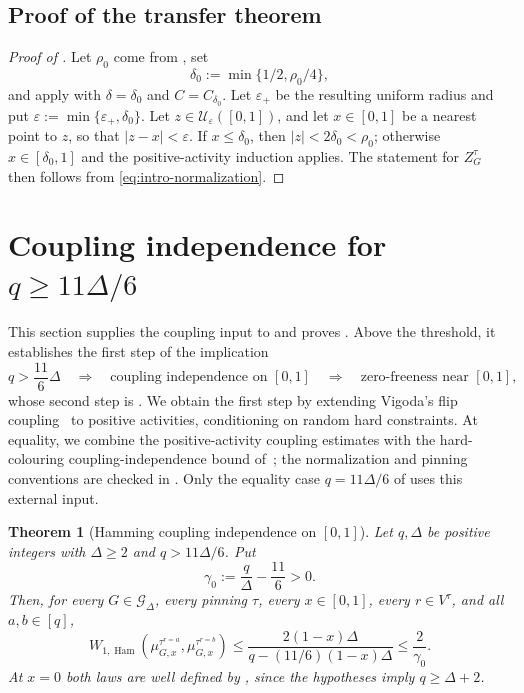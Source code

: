 \documentclass[11pt,reqno]{article}
\theoremstyle{plain}
\newtheorem{theorem}{Theorem}[section]
\theoremstyle{definition}
\theoremstyle{remark}
\theoremstyle{definition}
\theoremstyle{remark}
\newcommand{\eps}{\varepsilon}
\DeclareMathOperator{\Ham}{Ham}
\newcommand{\Deg}{\Delta}                        %
\newcommand{\WHam}{W_{1,\Ham}}                   %
\newcommand{\colours}{[q]}                        %
\newcommand{\Gdeg}{\mathcal{G}_{\Deg}}
\newcommand{\Zpin}[2]{Z_{#1}^{#2}}
\newcommand{\mupin}[3]{\mu_{#1,#3}^{#2}}
\newcommand{\gapq}{\gamma_0}
\begin{document}
\subsection{Proof of the transfer theorem}
\label{sec:transfer-proof-end}

\begin{proof}[Proof of ]
Let \(\rho_0\) come from , set
\[
  \delta_0:=\min\{1/2,\rho_0/4\},
\]
and apply  with
\(\delta=\delta_0\) and \(C=C_{\delta_0}\).  Let \(\eps_+\) be the
resulting uniform radius and put \(\eps:=\min\{\eps_+,\delta_0\}\).
Let \(z\in\mathcal U_\eps([0,1])\), and let \(x\in[0,1]\) be a nearest
point to \(z\), so that \(|z-x|<\eps\).  If \(x\le\delta_0\), then
\(|z|<2\delta_0<\rho_0\); otherwise \(x\in[\delta_0,1]\) and the
positive-activity induction applies.  The statement for \(\Zpin{G}{\tau}\)
then follows from \eqref{eq:intro-normalization}.
\end{proof}

\section{\texorpdfstring{Coupling independence for \(q\ge11\Deg/6\)}
{Coupling independence for q >= 11 Delta / 6}}
\label{sec:strict-potts}

This section supplies the coupling input to  and
proves .  Above the threshold, it establishes the
first step of the implication
\[
  q>\frac{11}{6}\Deg
  \quad\Longrightarrow\quad
  \text{coupling independence on \([0,1]\)}
  \quad\Longrightarrow\quad
  \text{zero-freeness near \([0,1]\)},
\]
whose second step is .  We obtain the first step
by extending Vigoda's flip coupling~\cite{Vigoda2000} to positive
activities, conditioning on random hard constraints.  At equality, we
combine the positive-activity coupling estimates with the hard-colouring
coupling-independence bound of~\cite[Theorem~20]{CFFGZZ2024}; the
normalization and pinning conventions are checked in
.  Only the equality case \(q=11\Deg/6\)
of  uses this external input.

\begin{theorem}[Hamming coupling independence on \texorpdfstring{$[0,1]$}{[0,1]}]
\label{thm:strict-ci}
Let \(q,\Deg\) be positive integers with \(\Deg\ge2\) and
\(q>11\Deg/6\).  Put
\[
  \gapq:=\frac q\Deg-\frac{11}{6}>0.
\]
Then, for every \(G\in\Gdeg\), every pinning \(\tau\), every
\(x\in[0,1]\), every \(r\in V^\tau\), and all
\(a,b\in\colours\),
\[
  \WHam\!\left(
    \mupin{G}{\tau^{r=a}}{x},
    \mupin{G}{\tau^{r=b}}{x}
  \right)
  \le
  \frac{2(1-x)\Deg}{q-(11/6)(1-x)\Deg}
  \le\frac2{\gapq}.
\]
At \(x=0\) both laws are well defined by , since
the hypotheses imply \(q\ge\Deg+2\).
\end{theorem}
\end{document}
